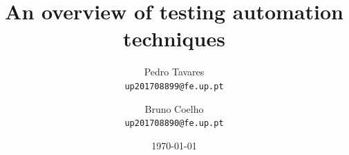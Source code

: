 \documentclass[11pt,a4paper]{article}
\title{An overview of testing automation techniques}
\date{\monthyeardate\today}
\author{
  Pedro Tavares \\ \texttt{up201708899@fe.up.pt} 
  \and Bruno Coelho \\ \texttt{up201708890@fe.up.pt}
}
\begin{document}
\begin{titlingpage}
\maketitle
\end{titlingpage}

\newpage
\tableofcontents
\newpage
{}

\newpage







\end{document}
